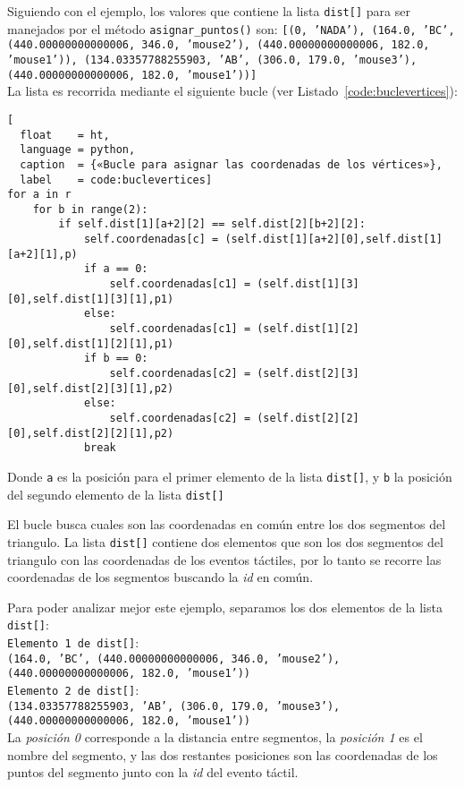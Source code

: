 Siguiendo con el ejemplo, los valores que contiene la lista \texttt{dist[]} para ser manejados por el método \texttt{asignar\_puntos()} son:
\texttt{[(0, 'NADA'), (164.0, 'BC', (440.00000000000006, 346.0, 'mouse2'), (440.00000000000006, 182.0, 'mouse1')), (134.03357788255903, 'AB', (306.0, 179.0, 'mouse3'), (440.00000000000006, 182.0, 'mouse1'))]}\\

La lista es recorrida mediante el siguiente bucle (ver Listado~\ref{code:buclevertices}):
\begin{lstlisting}[
  float    = ht,  
  language = python,
  caption  = {«Bucle para asignar las coordenadas de los vértices»},
  label    = code:buclevertices]
for a in r
	for b in range(2):
		if self.dist[1][a+2][2] == self.dist[2][b+2][2]:
			self.coordenadas[c] = (self.dist[1][a+2][0],self.dist[1][a+2][1],p)
			if a == 0:
				self.coordenadas[c1] = (self.dist[1][3][0],self.dist[1][3][1],p1)
			else:
				self.coordenadas[c1] = (self.dist[1][2][0],self.dist[1][2][1],p1)
			if b == 0:
				self.coordenadas[c2] = (self.dist[2][3][0],self.dist[2][3][1],p2)
			else:
				self.coordenadas[c2] = (self.dist[2][2][0],self.dist[2][2][1],p2)
			break
\end{lstlisting}
Donde \texttt{a} es la posición para el primer elemento de la lista \texttt{dist[]}, y \texttt{b} la posición del segundo elemento de la lista \texttt{dist[]}

El bucle busca cuales son las coordenadas en común entre los dos segmentos del triangulo. La lista \texttt{dist[]} contiene dos elementos que son los dos segmentos del triangulo con las coordenadas de los eventos táctiles, por lo tanto se recorre las coordenadas de los segmentos buscando la \textit{id} en común. 

Para poder analizar mejor este ejemplo, separamos los dos elementos de la lista \texttt{dist[]}:\\

\texttt{Elemento 1 de dist[]}:\\
\texttt{(164.0, 'BC', (440.00000000000006, 346.0, 'mouse2'), (440.00000000000006, 182.0, 'mouse1'))}\\

\texttt{Elemento 2 de dist[]}:\\
\texttt{(134.03357788255903, 'AB', (306.0, 179.0, 'mouse3'), (440.00000000000006, 182.0, 'mouse1'))}\\

La \textit{posición 0} corresponde a la distancia entre segmentos, la \textit{posición 1} es el nombre del segmento, y las dos restantes posiciones son las coordenadas de los puntos del segmento junto con la \textit{id} del evento táctil.\\

